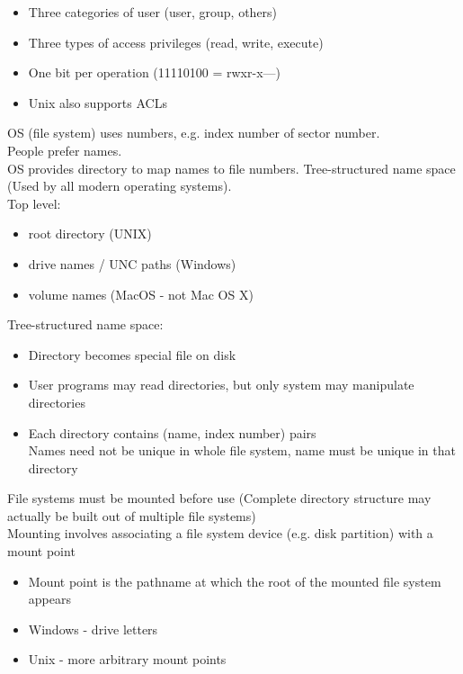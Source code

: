\documentclass[number]{notes}
\begin{document}
\begin{landscape}
\begin{multicols}{3}
\begin{itemize}[nolistsep]
    \item Three categories of user (user, group, others)
    \item Three types of access privileges (read, write, execute)
    \item One bit per operation (11110100 = rwxr-x---)
    \item Unix also supports ACLs
\end{itemize}
OS (file system) uses numbers, e.g. index number of sector number.\\
People prefer names.\\
OS provides directory to map names to file numbers.
Tree-structured name space (Used by all modern operating systems).\\
Top level:
\begin{itemize}[nolistsep]
    \item root directory (UNIX)
    \item drive names / UNC paths (Windows)
    \item volume names (MacOS - not Mac OS X)
\end{itemize}
Tree-structured name space:
\begin{itemize}[nolistsep]
    \item Directory becomes special file on disk
    \item User programs may read directories, but only system may manipulate directories
    \item Each directory contains (name, index number) pairs\\
    Names need not be unique in whole file system, name must be unique in that directory
\end{itemize}
File systems must be mounted before use (Complete directory structure may actually be built out of multiple file systems)\\
Mounting involves associating a file system device (e.g. disk partition) with a mount point
\begin{itemize}[nolistsep]
    \item Mount point is the pathname at which the root of the mounted file system appears
    \item Windows - drive letters
    \item Unix - more arbitrary mount points
\end{itemize}
\begin{itemize}[nolistsep]

\end{itemize}
\end{multicols}
\end{landscape}
\end{document}
